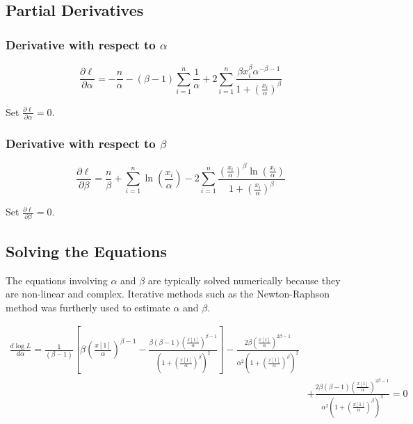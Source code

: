 \documentclass{article}
\begin{document}
\subsection*{Partial Derivatives}


\subsubsection*{Derivative with respect to $\alpha$}

\[
\frac{\partial \ell}{\partial \alpha} = -\frac{n}{\alpha} - (\beta-1) \sum_{i=1}^{n} \frac{1}{\alpha} + 2 \sum_{i=1}^{n} \frac{\beta x_i^\beta \alpha^{-\beta-1}}{1 + \left(\frac{x_i}{\alpha}\right)^{\beta}}
\]

Set $\frac{\partial \ell}{\partial \alpha} = 0$.

\subsubsection*{Derivative with respect to $\beta$}

\[
\frac{\partial \ell}{\partial \beta} = \frac{n}{\beta} + \sum_{i=1}^{n} \ln \left(\frac{x_i}{\alpha}\right) - 2 \sum_{i=1}^{n} \frac{\left(\frac{x_i}{\alpha}\right)^{\beta} \ln \left(\frac{x_i}{\alpha}\right)}{1 + \left(\frac{x_i}{\alpha}\right)^{\beta}}
\]

Set $\frac{\partial \ell}{\partial \beta} = 0$.

\subsection*{Solving the Equations}

The equations involving $\alpha$ and $\beta$ are typically solved numerically because they are non-linear and complex. Iterative methods such as the Newton-Raphson method was furtherly used to estimate $\alpha$ and $\beta$.


\[
\begin{aligned}
\frac{d \log L}{d \alpha} = \frac{1}{(\beta - 1)} \left[ \beta \left( \frac{x[1]}{\alpha} \right)^{\beta - 1} - \frac{\beta (\beta - 1) \left( \frac{x[1]}{\alpha} \right)^{\beta - 1}}{\left( 1 + \left( \frac{x[1]}{\alpha} \right)^{\beta} \right)^2} \right] - \frac{2 \beta \left( \frac{x[1]}{\alpha} \right)^{2 \beta - 1}}{\alpha^2 \left( 1 + \left( \frac{x[1]}{\alpha} \right)^{\beta} \right)^2} \\
&+ \frac{2 \beta (\beta - 1) \left( \frac{x[1]}{\alpha} \right)^{2 \beta - 1}}{\alpha^2 \left( 1 + \left( \frac{x[1]}{\alpha} \right)^{\beta} \right)^3} = 0 \\
\end{aligned}
\]
\end{document}

